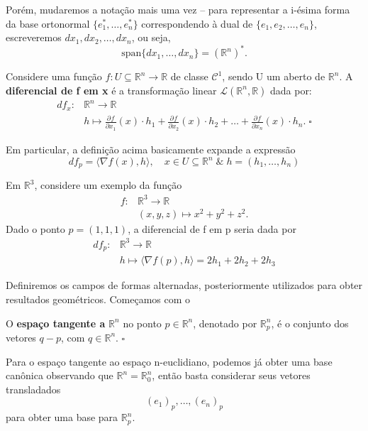 \documentclass[../differential_forms.tex]{subfiles}
\begin{document}
Porém, mudaremos a notação mais uma vez -- para representar a i-ésima forma da base ortonormal \(\{e_{1}^{*}, \dotsc , e_{n}^{*}\}\) correspondendo à dual de
\(\{e_{1}, e_{2}, \dotsc , e_{n}\}\), escreveremos \(dx_1, dx_2, \dotsc , dx_{n}\), ou seja,
\[
	\mathrm{span}\{dx_1, \dotsc , dx_{n}\} = (\mathbb{R}^{n})^{*}.
\]
\begin{def*}
	Considere uma função \(f:U\subseteq \mathbb{R}^{n}\rightarrow \mathbb{R}\) de classe \(\mathcal{C}^{1}\), sendo U um aberto de
	\(\mathbb{R}^{n}\). A \textbf{diferencial de f em x} é a transformação linear \(\mathcal{L}(\mathbb{R}^{n}, \mathbb{R})\) dada por:
	\begin{align*}
		df_x: & \mathbb{R}^{n}\rightarrow\mathbb{R}                                                                                                                                                         \\
		      & h\longmapsto \frac{\partial^{}f}{\partial x_1^{}}(x)\cdot h_1 + \frac{\partial^{}f}{\partial x_2^{}}(x)\cdot h_2 + \dotsc + \frac{\partial^{}f}{\partial x_{n}^{}}(x)\cdot h_{n}.\; \square
	\end{align*}
\end{def*}
Em particular, a definição acima basicamente expande a expressão
\[
	df_p = \langle \nabla f(x), h \rangle,\quad x\in U\subseteq \mathbb{R}^{n}\;\&\; h = (h_1, \dotsc , h_{n})
\]
\begin{example}
	Em \(\mathbb{R}^{3}\), considere um exemplo da função
	\begin{align*}
		f: & \mathbb{R}^{3}\rightarrow\mathbb{R}         \\
		   & (x, y, z)\longmapsto x^{2} + y^{2} + z^{2}.
	\end{align*}
	Dado o ponto \(p = (1, 1, 1)\), a diferencial de f em p seria dada por
	\begin{align*}
		df_p: & \mathbb{R}^{3}\rightarrow\mathbb{R}                              \\
		      & h\longmapsto \langle \nabla f(p), h \rangle = 2h_1 + 2h_2 + 2h_3
	\end{align*}
\end{example}

Definiremos os campos de formas alternadas, posteriormente utilizados para obter resultados geométricos. Começamos com o
\begin{def*}
	O \textbf{espaço tangente a }\(\mathbb{R}^{n}\) no ponto \(p\in \mathbb{R}^{n}\), denotado por \(\mathbb{R}_{p}^{n}\), é o conjunto dos vetores \(q-p\), com \(q\in \mathbb{R}^{n}\). \(\square\)
\end{def*}
Para o espaço tangente ao espaço n-euclidiano, podemos já obter uma base canônica observando que \(\mathbb{R}^{n} = \mathbb{R}_{0}^{n}\), então basta considerar seus vetores transladados
\[
	(e_1)_p, \dotsc , (e_{n})_p
\]
para obter uma base para \(\mathbb{R}_{p}^{n}\).
\end{document}
